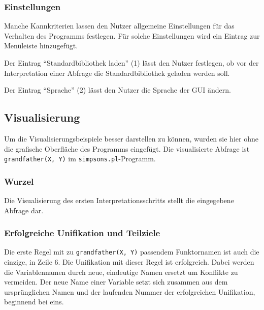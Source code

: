 \documentclass[parskip=full,11pt,twoside]{scrartcl}
\begin{document}
\subsubsection{Einstellungen}

Manche Kannkriterien lassen den Nutzer allgemeine Einstellungen für das Verhalten des Programms festlegen.
Für solche Einstellungen wird ein Eintrag zur Menüleiste hinzugefügt.

\begin{minipage}{\linewidth}
\end{minipage}

Der Eintrag \enquote{Standardbibliothek laden} (1) lässt den Nutzer festlegen, ob vor der Interpretation einer Abfrage die Standardbibliothek geladen werden soll.

Der Eintrag \enquote{Sprache} (2) lässt den Nutzer die Sprache der GUI ändern.

\subsection{Visualisierung}

Um die Visualisierungsbeispiele besser darstellen zu können, wurden sie hier ohne die grafische Oberfläche des Programms eingefügt.
Die visualisierte Abfrage ist \texttt{grandfather(X, Y)} im \texttt{simpsons.pl}-Programm.

\subsubsection{Wurzel}

\begin{minipage}{\linewidth}
\end{minipage}

Die Visualisierung des ersten Interpretationsschritts stellt die eingegebene Abfrage dar.

\subsubsection{Erfolgreiche Unifikation und Teilziele}

Die erste Regel mit zu \texttt{grandfather(X, Y)} passendem Funktornamen ist auch die einzige, in Zeile 6.
Die Unifikation mit dieser Regel ist erfolgreich.
Dabei werden die Variablennamen durch neue, eindeutige Namen ersetzt um Konflikte zu vermeiden.
Der neue Name einer Variable setzt sich zusammen aus dem ursprünglichen Namen und der laufenden Nummer der erfolgreichen Unifikation, beginnend bei eins.
\end{document}
